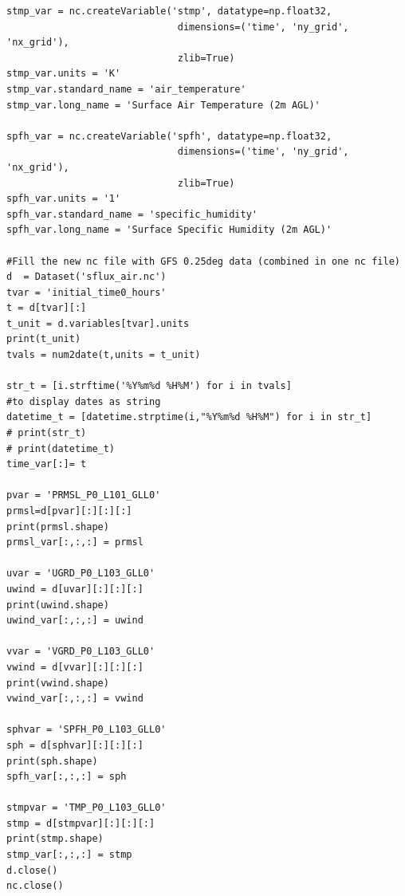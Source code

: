 \documentclass[preprints,briefreport,accept,oneauthor,pdftex]{Definitions/mdpi}
\begin{document}
\begin{verbatim}
stmp_var = nc.createVariable('stmp', datatype=np.float32,
                              dimensions=('time', 'ny_grid', 'nx_grid'),
                              zlib=True)
stmp_var.units = 'K'
stmp_var.standard_name = 'air_temperature'
stmp_var.long_name = 'Surface Air Temperature (2m AGL)'

spfh_var = nc.createVariable('spfh', datatype=np.float32,
                              dimensions=('time', 'ny_grid', 'nx_grid'),
                              zlib=True)
spfh_var.units = '1'
spfh_var.standard_name = 'specific_humidity'
spfh_var.long_name = 'Surface Specific Humidity (2m AGL)'
    
#Fill the new nc file with GFS 0.25deg data (combined in one nc file)
d  = Dataset('sflux_air.nc')    
tvar = 'initial_time0_hours'
t = d[tvar][:]
t_unit = d.variables[tvar].units
print(t_unit)
tvals = num2date(t,units = t_unit)

str_t = [i.strftime('%Y%m%d %H%M') for i in tvals] 
#to display dates as string
datetime_t = [datetime.strptime(i,"%Y%m%d %H%M") for i in str_t]
# print(str_t)
# print(datetime_t)
time_var[:]= t

pvar = 'PRMSL_P0_L101_GLL0'
prmsl=d[pvar][:][:][:]
print(prmsl.shape)
prmsl_var[:,:,:] = prmsl 

uvar = 'UGRD_P0_L103_GLL0'
uwind = d[uvar][:][:][:]
print(uwind.shape)
uwind_var[:,:,:] = uwind 

vvar = 'VGRD_P0_L103_GLL0'
vwind = d[vvar][:][:][:]
print(vwind.shape)
vwind_var[:,:,:] = vwind 

sphvar = 'SPFH_P0_L103_GLL0'
sph = d[sphvar][:][:][:]
print(sph.shape)
spfh_var[:,:,:] = sph

stmpvar = 'TMP_P0_L103_GLL0'
stmp = d[stmpvar][:][:][:]
print(stmp.shape)
stmp_var[:,:,:] = stmp 
d.close()
nc.close()
\end{verbatim}
\clearpage
\end{document}
